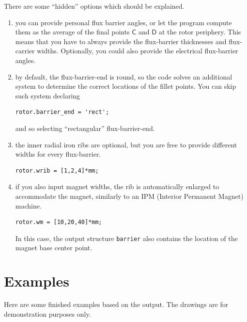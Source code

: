 \documentclass[b5paper,11pt,oneside,fleqn]{article}
\newcommand{\pt}[1]{\mathsf{#1}}
\begin{document}
There are some ``hidden'' options which should be explained.
\begin{enumerate}
\item you can provide personal flux barrier angles, or let the program compute 
them as the average of the final points $ \pt{C} $ and $ \pt{D} $ at the rotor 
periphery.
This means that you have to always provide the flux-barrier thicknesses and 
flux-carrier widths.
Optionally, you could also provide the electrical flux-barrier angles.

\item by default, the flux-barrier-end is round, so the code solves an 
additional system to determine the correct locations of the fillet points.
You can skip such system declaring 
\begin{lstlisting}[style=Matlab]
rotor.barrier_end = 'rect';
\end{lstlisting}
and so selecting ``rectangular'' flux-barrier-end.

\item the inner radial iron ribs are optional, but you are free to provide 
different widths for every flux-barrier.
\begin{lstlisting}[style=Matlab]
rotor.wrib = [1,2,4]*mm;
\end{lstlisting}

\item if you also input magnet widths, the rib is automatically enlarged to 
accommodate the magnet, similarly to an IPM (Interior Permanent Magnet) machine.
\begin{lstlisting}[style=Matlab]
rotor.wm = [10,20,40]*mm;
\end{lstlisting}
In this case, the output structure \texttt{barrier} also contains the location 
of the magnet base center point.

\end{enumerate}



\clearpage
\section{Examples}
Here are some finished examples based on the output.
The drawings are for demonstration purposes only.

\vspace{\baselineskip}
\end{document}
